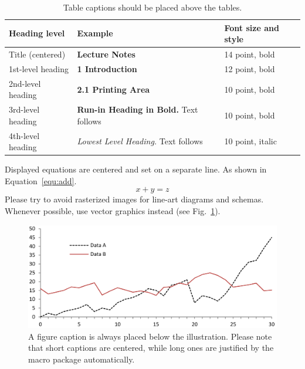 \documentclass[runningheads]{llncs}
\begin{document}
\begin{table}
	\caption{Table captions should be placed above the
		tables.}\label{tab1}
	\begin{tabular}{|l|l|l|}
		\hline
		Heading level     & Example                                          & Font size and style \\
		\hline
		Title (centered)  & {\Large\bfseries Lecture Notes}                  & 14 point, bold      \\
		1st-level heading & {\large\bfseries 1 Introduction}                 & 12 point, bold      \\
		2nd-level heading & {\bfseries 2.1 Printing Area}                    & 10 point, bold      \\
		3rd-level heading & {\bfseries Run-in Heading in Bold.} Text follows & 10 point, bold      \\
		4th-level heading & {\itshape Lowest Level Heading.} Text follows    & 10 point, italic    \\
		\hline
	\end{tabular}
\end{table}


\noindent Displayed equations are centered and set on a separate
line. As shown in Equation~\ref{equ:add}.
\begin{equation}\label{equ:add}
	x + y = z
\end{equation}
Please try to avoid rasterized images for line-art diagrams and
schemas. Whenever possible, use vector graphics instead (see
Fig.~\ref{fig1}).

\begin{figure}
	\includegraphics[width=\textwidth]{fig1.png}
	\caption{A figure caption is always placed below the illustration.
		Please note that short captions are centered, while long ones are
		justified by the macro package automatically.} \label{fig1}
\end{figure}
\end{document}
